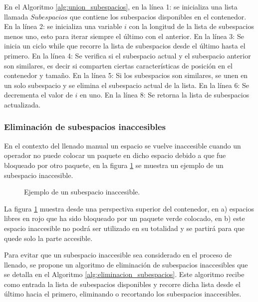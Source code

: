 En el Algoritmo \ref{alg:union_subespacios}, en la línea 1: se inicializa una lista llamada $Subespacios$ que contiene los subespacios disponibles en el contenedor. En la línea 2: se inicializa una variable $i$ con la longitud de la lista de subespacios menos uno, esto para iterar siempre el último con el anterior. En la línea 3: Se inicia un ciclo while que recorre la lista de subespacios desde el último hasta el primero. En la línea 4: Se verifica si el subespacio actual y el subespacio anterior son similares, es decir si comparten ciertas características de posición en el contenedor y tamaño. En la línea 5: Si los subespacios son similares, se unen en un solo subespacio y se elimina el subespacio actual de la lista. En la línea 6: Se decrementa el valor de $i$ en uno. En la línea 8: Se retorna la lista de subespacios actualizada.

\subsubsection{Eliminación de subespacios inaccesibles}

En el contexto del llenado manual un espacio se vuelve inaccesible cuando un operador no puede colocar un paquete en dicho espacio debido a que fue bloqueado por otro paquete, en la figura \ref{fig:subespacio_inaccesible} se muestra un ejemplo de un subespacio inaccesible.

\begin{figure}[H]
    \centering
    
    \caption{Ejemplo de un subespacio inaccesible.}
    \label{fig:subespacio_inaccesible}
\end{figure}

La figura \ref{fig:subespacio_inaccesible} muestra desde una perspectiva superior del contenedor, en a) espacios libres en rojo que ha sido bloqueado por un paquete verde colocado, en b) este espacio inaccesible no podrá ser utilizado en su totalidad y se partirá para que quede solo la parte accesible.

Para evitar que un subespacio inaccesible sea considerado en el proceso de llenado, se propone un algoritmo de eliminación de subespacios inaccesibles que se detalla en el Algoritmo \ref{alg:eliminacion_subespacios}. Este algoritmo recibe como entrada la lista de subespacios disponibles y recorre dicha lista desde el último hacia el primero, eliminando o recortando los subespacios inaccesibles.

